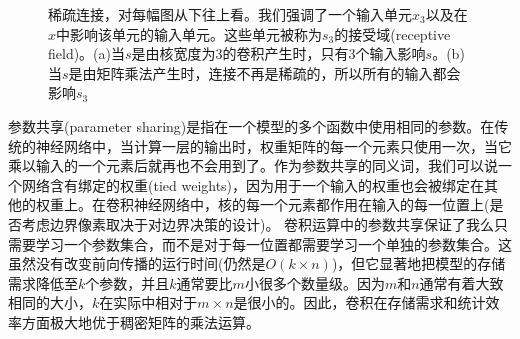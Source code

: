 \documentclass[12pt,a4paper,titlepage]{article}
\begin{document}
\begin{figure}[htbp] %
\centering




\caption{稀疏连接，对每幅图从下往上看。我们强调了一个输入单元$x_3$以及在$x$中影响该单元的输入单元。这些单元被称为$s_3$的接受域(receptive field)。(a)当$s$是由核宽度为3的卷积产生时，只有3个输入影响$s$。(b)当$s$是由矩阵乘法产生时，连接不再是稀疏的，所以所有的输入都会影响$s_3$}
\label{fig:sparse_dense_receptive_field}
\end{figure}

\par
参数共享(parameter sharing)是指在一个模型的多个函数中使用相同的参数。在传统的神经网络中，当计算一层的输出时，权重矩阵的每一个元素只使用一次，当它乘以输入的一个元素后就再也不会用到了。作为参数共享的同义词，我们可以说一个网络含有绑定的权重(tied weights)，因为用于一个输入的权重也会被绑定在其他的权重上。在卷积神经网络中，核的每一个元素都作用在输入的每一位置上(是否考虑边界像素取决于对边界决策的设计)。 卷积运算中的参数共享保证了我么只需要学习一个参数集合，而不是对于每一位置都需要学习一个单独的参数集合。这虽然没有改变前向传播的运行时间(仍然是$O(k\times n)$)，但它显著地把模型的存储需求降低至$k$个参数，并且$k$通常要比$m$小很多个数量级。因为$m$和$n$通常有着大致相同的大小，$k$在实际中相对于$m \times n$是很小的。因此，卷积在存储需求和统计效率方面极大地优于稠密矩阵的乘法运算。
\end{document}
